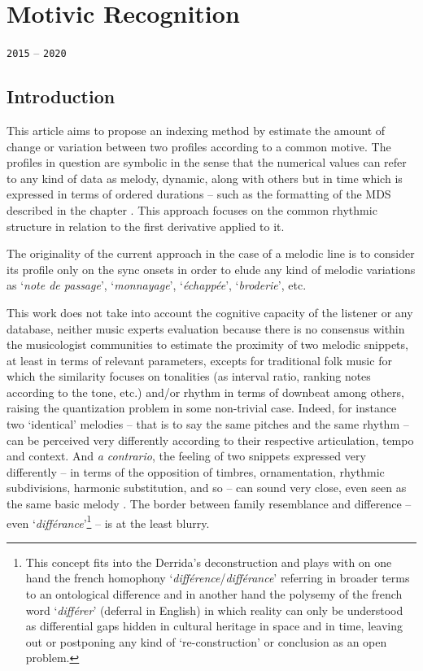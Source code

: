 \chapter{Motivic Recognition}
\thispagestyle{empty}

\label{motrec}
{\texttt{2015} -- \texttt{2020}}

\bigskip
\smallskip

\section{Introduction}
This article aims to propose an indexing method by estimate the amount of change or variation between two profiles according to a common motive. The profiles in question are symbolic in the sense that the numerical values can refer to any kind of data as melody, dynamic, along with others but in time which is expressed in terms of ordered durations -- such as the formatting of the MDS described in the chapter \textsl{}. This approach focuses on the common rhythmic structure in relation to the first derivative applied to it.

The originality of the current approach in the case of a melodic line is to consider its profile only on the sync onsets in order to elude any kind of melodic variations as `\textit{note de passage}', `\textit{monnayage}', `\textit{\'{e}chapp\'{e}e}', `\textit{broderie}', etc.

\bigskip

This work does not take into account the cognitive capacity of the listener or any database, neither music experts evaluation because there is no consensus within the musicologist communities to estimate the proximity of two melodic snippets, at least in terms of relevant parameters, excepts for traditional folk music for which the similarity focuses on tonalities (as interval ratio, ranking notes according to the tone, etc.) and/or rhythm in terms of downbeat among others, raising the quantization problem \citep{desqz} in some non-trivial case. Indeed, for instance two `identical' melodies -- that is to say the same pitches and the same rhythm -- can be perceived very differently according to their respective articulation, tempo and context. And \textit{a contrario}, the feeling of two snippets expressed very differently -- in terms of the opposition of timbres, ornamentation, rhythmic subdivisions, harmonic substitution, and so -- can sound very close, even seen as the same basic melody \citep{hfra}. The border between family resemblance and difference -- even `\textit{diff\'{e}rance}'\citep{dlg}\footnote{This concept fits into the Derrida's deconstruction and plays with on one hand the french homophony `\textit{diff\'{e}rence}/\textit{diff\'{e}rance}' referring in broader terms to an ontological difference and in another hand the polysemy of the french word `\textit{diff\'{e}rer}' (deferral in English) in which reality can only be understood as differential gaps hidden in cultural heritage in space and in time, leaving out or postponing any kind of `re-construction' or conclusion as an open problem.} -- is at the least blurry.

